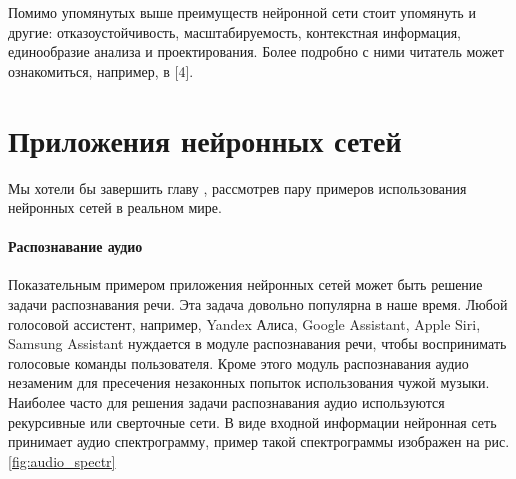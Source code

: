 \documentclass[a4paper,12pt]{report}
\begin{document}
Помимо упомянутых выше преимуществ нейронной сети стоит упомянуть и
другие: отказоустойчивость, масштабируемость, контекстная информация,
единообразие анализа и проектирования. Более подробно с ними читатель
может ознакомиться, например, в [4].

\section{Приложения нейронных сетей}
Мы хотели бы завершить главу ,
рассмотрев пару примеров использования нейронных сетей в реальном
мире.

\paragraph{Распознавание аудио}
%
%
%
Показательным примером приложения нейронных сетей может быть решение
задачи распознавания речи. Эта задача довольно популярна в наше время.
Любой голосовой ассистент, например, Yandex Алиса, Google Assistant,
Apple Siri, Samsung Assistant нуждается в модуле распознавания речи,
чтобы воспринимать голосовые команды пользователя. Кроме этого модуль распознавания
аудио незаменим для пресечения незаконных попыток использования чужой
музыки. Наиболее часто для решения задачи распознавания аудио
используются рекурсивные или сверточные сети. В виде входной
информации нейронная сеть принимает аудио спектрограмму, пример такой
спектрограммы изображен на рис. \ref{fig:audio_spectr}
\end{document}
